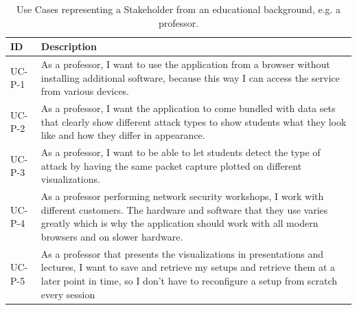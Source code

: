\begin{table}[]
\centering
\begin{tabular}{|p{1.6cm}|p{12cm}|}
\hline
\textbf{ID} & \textbf{Description} \\ \hline

UC-P-1         & As a professor, I want to use the application from a browser without installing additional software, because this way I can access the service from various devices.\\ \hline
UC-P-2        & As a professor, I want the application to come bundled with data sets that clearly show different attack types to show students what they look like and how they differ in appearance.\\ \hline
UC-P-3        & As a professor, I want to be able to let students detect the type of attack by having the same packet capture plotted on different visualizations.\\ \hline
UC-P-4       & As a professor performing network security workshops, I work with different customers. The hardware and software that they use varies greatly which is why the application should work with all modern browsers and on slower hardware.\\ \hline
UC-P-5      & As a professor that presents the visualizations in presentations and lectures, I want to save and retrieve my setups and retrieve them at a later point in time, so I don't have to reconfigure a setup from scratch every session\\ \hline

\end{tabular}
\caption{Use Cases representing a Stakeholder from an educational background, e.g. a professor.}
\label{table:us-professor}
\end{table} 



